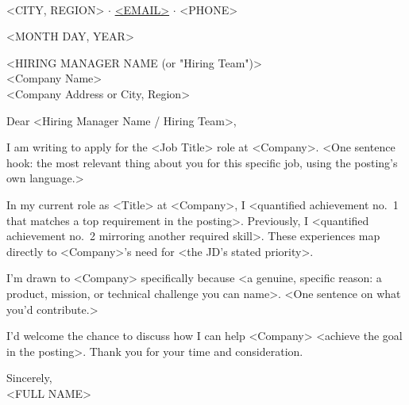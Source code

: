 \documentclass[letterpaper,11pt]{article}
\begin{document}
{\Large\bfseries <FULL NAME>}\\[2pt]
<CITY, REGION> $\cdot$
\href{mailto:<EMAIL>}{<EMAIL>} $\cdot$
<PHONE>

\vspace{6pt}
<MONTH DAY, YEAR>          %

\vspace{2pt}
<HIRING MANAGER NAME (or "Hiring Team")>\\
<Company Name>\\
<Company Address or City, Region>

\vspace{4pt}
Dear <Hiring Manager Name / Hiring Team>,

I am writing to apply for the <Job Title> role at <Company>. <One sentence hook:
the most relevant thing about you for this specific job, using the posting's own
language.>

In my current role as <Title> at <Company>, I <quantified achievement no.~1 that
matches a top requirement in the posting>. Previously, I <quantified achievement
no.~2 mirroring another required skill>. These experiences map directly to <Company>'s
need for <the JD's stated priority>.

I'm drawn to <Company> specifically because <a genuine, specific reason: a product,
mission, or technical challenge you can name>. <One sentence on what you'd contribute.>

I'd welcome the chance to discuss how I can help <Company> <achieve the goal in
the posting>. Thank you for your time and consideration.

\vspace{6pt}
Sincerely,\\[16pt]
<FULL NAME>
\end{document}
